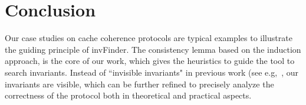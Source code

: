 \documentclass{llncs}
\begin{document}
\section{Conclusion}
Our case studies on cache coherence protocols are typical examples
to illustrate the guiding principle of {\sf invFinder}. The
 consistency lemma based on the induction approach, is the
core of our work, which gives the heuristics to guide the tool
 to search invariants. Instead of ``invisible invariants" in previous work
 (see e.g,~\cite{Pnueli2001}, our invariants are visible,
 which can be further refined to precisely
 analyze the correctness of the protocol both in theoretical and practical aspects.



\end{document}
